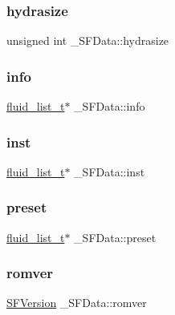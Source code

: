 \subsubsection{\texorpdfstring{hydrasize}{hydrasize}}
{\footnotesize\ttfamily unsigned int \+\_\+\+S\+F\+Data\+::hydrasize}

\mbox{\label{struct__SFData_aa9fd55a01bfcc8002d7bdd47506e92be}} 
\subsubsection{\texorpdfstring{info}{info}}
{\footnotesize\ttfamily \hyperlink{fluid__list_8h_a3ef7535d4290862c0af118569223bd89}{fluid\+\_\+list\+\_\+t}$\ast$ \+\_\+\+S\+F\+Data\+::info}

\mbox{\label{struct__SFData_aa9b9f9529eb19a65904833dd5408ac7b}} 
\subsubsection{\texorpdfstring{inst}{inst}}
{\footnotesize\ttfamily \hyperlink{fluid__list_8h_a3ef7535d4290862c0af118569223bd89}{fluid\+\_\+list\+\_\+t}$\ast$ \+\_\+\+S\+F\+Data\+::inst}

\mbox{\label{struct__SFData_ab95484883b0576f0bb77afd63cfa1e8b}} 
\subsubsection{\texorpdfstring{preset}{preset}}
{\footnotesize\ttfamily \hyperlink{fluid__list_8h_a3ef7535d4290862c0af118569223bd89}{fluid\+\_\+list\+\_\+t}$\ast$ \+\_\+\+S\+F\+Data\+::preset}

\mbox{\label{struct__SFData_a2a4feef795087124e319dda9a158e54c}} 
\subsubsection{\texorpdfstring{romver}{romver}}
{\footnotesize\ttfamily \hyperlink{fluid__sffile_8h_abd218ce0bb10f13c622c5b605abccbc9}{S\+F\+Version} \+\_\+\+S\+F\+Data\+::romver}

